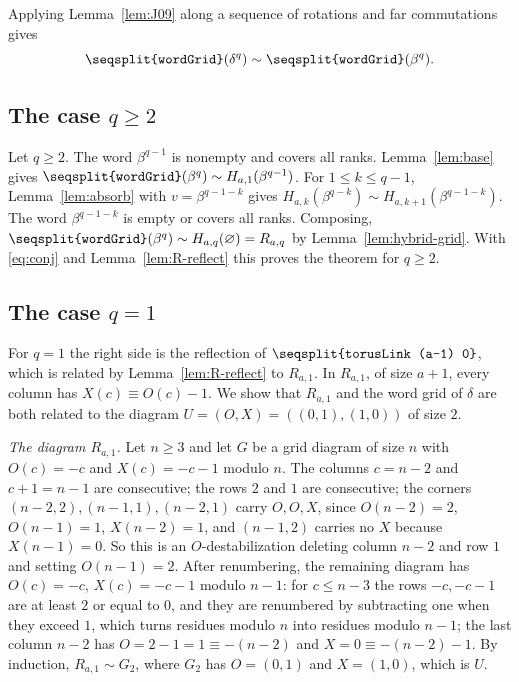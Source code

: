 \documentclass[11pt]{amsart}
\theoremstyle{definition}
\theoremstyle{remark}
\newcommand{\lean}[1]{\texttt{\seqsplit{#1}}}
\newcommand{\Mov}{\mathrel{\sim}}
\begin{document}
Applying Lemma~\ref{lem:J09} along a sequence of rotations and far commutations gives
\begin{equation}\label{eq:conj}
\lean{wordGrid}(\delta^q)\Mov\lean{wordGrid}(\beta^q).
\end{equation}

\subsection{The case \texorpdfstring{$q\ge2$}{q at least 2}}
Let $q\ge2$. The word $\beta^{q-1}$ is nonempty and covers all ranks. Lemma~\ref{lem:base} gives
$\lean{wordGrid}(\beta^q)\Mov H_{a,1}(\beta^{q-1})$. For $1\le k\le q-1$, Lemma~\ref{lem:absorb} with
$v=\beta^{q-1-k}$ gives $H_{a,k}(\beta^{q-k})\Mov H_{a,k+1}(\beta^{q-1-k})$. The word
$\beta^{q-1-k}$ is empty or covers all ranks. Composing,
$\lean{wordGrid}(\beta^q)\Mov H_{a,q}(\varnothing)=R_{a,q}$ by Lemma~\ref{lem:hybrid-grid}. With
\eqref{eq:conj} and Lemma~\ref{lem:R-reflect} this proves the theorem for $q\ge2$.

\subsection{The case \texorpdfstring{$q=1$}{q equal to 1}}
For $q=1$ the right side is the reflection of $\lean{torusLink (a-1) 0}$, which is related by
Lemma~\ref{lem:R-reflect} to $R_{a,1}$. In $R_{a,1}$, of size $a+1$, every column has
$X(c)\equiv O(c)-1$. We show that $R_{a,1}$ and the word grid of $\delta$ are both related to the
diagram $U=(O,X)=((0,1),(1,0))$ of size $2$.

\emph{The diagram $R_{a,1}$.} Let $n\ge3$ and let $G$ be a grid diagram of size $n$ with $O(c)=-c$
and $X(c)=-c-1$ modulo $n$. The columns $c=n-2$ and $c+1=n-1$ are consecutive; the rows $2$ and $1$
are consecutive; the corners $(n-2,2),(n-1,1),(n-2,1)$ carry $O,O,X$, since $O(n-2)=2$, $O(n-1)=1$,
$X(n-2)=1$, and $(n-1,2)$ carries no $X$ because $X(n-1)=0$. So this is an $O$-destabilization deleting
column $n-2$ and row $1$ and setting $O(n-1)=2$. After renumbering, the remaining diagram has
$O(c)=-c$, $X(c)=-c-1$ modulo $n-1$: for $c\le n-3$ the rows $-c,-c-1$ are at least $2$ or equal to
$0$, and they are renumbered by subtracting one when they exceed $1$, which turns residues modulo $n$
into residues modulo $n-1$; the last column $n-2$ has $O=2-1=1\equiv-(n-2)$ and $X=0\equiv -(n-2)-1$.
By induction, $R_{a,1}\Mov G_2$, where $G_2$ has $O=(0,1)$ and $X=(1,0)$, which is $U$.
\end{document}
